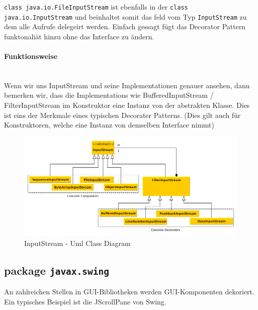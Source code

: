 	\texttt{class java.io.FileInputStream} ist ebenfalls in der \texttt{class java.io.InputStream} und beinhaltet somit das feld vom Typ \texttt{InputStream} zu dem alle Aufrufe delegeirt werden.
	Einfach gessagt fügt das Decorator Pattern funktonaliät hinzu ohne das Interface zu ändern.
	
	\paragraph{Funktionsweise \cite{decoratorStack} \cite{threePatterns}}\mbox{}\\
	Wenn wir uns InputStream und seine Implementationen genauer ansehen, dann bemerken wir, dass die Implementations wie BufferedInputStream / FilterInputStream im Konstruktor eine Instanz von der abstrakten Klasse. Dies ist eins der Merkmale eines typischen Decorater Patterns. (Dies gilt auch für Konstruktoren, welche eine Instanz von demselben Interface nimmt)
	
	\vspace{1cm}
	
	\begin{figure}[!h]
		\begin{center}
			\includegraphics[width=0.9\linewidth]{images/api-inputstream-gr.png}
			\caption{InputStream - Uml Class Diagram \cite{pdf1}}
			\label{Decorator Pattern - Klassen Diagramm}
		\end{center}
	\end{figure}
		

\clearpage


	\subsection{package \texttt{javax.swing} \cite{pdf1} \cite{javaApi}}
	An zahlreichen Stellen in GUI-Bibliotheken werden GUI-Komponenten dekoriert. Ein typisches Beispiel ist die JScrollPane von Swing.
	
